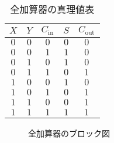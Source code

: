 \begin{table}[H]
	\caption{全加算器の真理値表}
	\label{tab14-3}
	\centering
	\begin{tabular}{c|c|c||c|c}
		\hline
		$X$ & $Y$ & $C_{\mathrm{in}}$ & $S$ & $C_{\mathrm{out}}$\\
        \hline\hline
        $0$ & $0$ & $0$ & $0$ & $0$\\
        $0$ & $0$ & $1$ & $1$ & $0$\\
        $0$ & $1$ & $0$ & $1$ & $0$\\
        $0$ & $1$ & $1$ & $0$ & $1$\\
        $1$ & $0$ & $0$ & $1$ & $0$\\
        $1$ & $0$ & $1$ & $0$ & $1$\\
        $1$ & $1$ & $0$ & $0$ & $1$\\
        $1$ & $1$ & $1$ & $1$ & $1$\\
		\hline
	\end{tabular}
\end{table}

\begin{figure}[H]
	\begin{center}
		\caption{全加算器のブロック図}
		\label{fig14-4}
	\end{center}
\end{figure}
